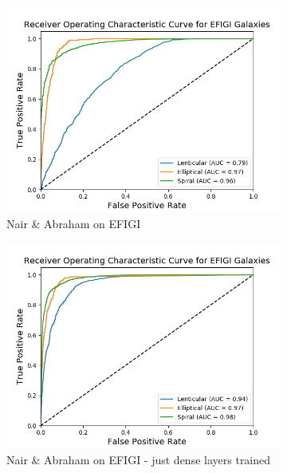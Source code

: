 \documentclass[12pt, onecolumn]{aa}
\begin{document}
\begin{figure}[t!]
  \begin{subfigure}[t]{0.5\linewidth}
    \includegraphics[width=\linewidth]{Figures/Results_ROC's/ROC_A_on_E.png} 
    \caption{ Nair \& Abraham on EFIGI} \label{fig:A_on_e}
  \end{subfigure} 
  \begin{subfigure}[t]{0.5\linewidth}
    \includegraphics[width=\linewidth]{Figures/Results_ROC's/A_on_E_JD.png} 
    \caption{ Nair \& Abraham on EFIGI - just dense layers trained} \label{fig:A_on_e_JD}
  \end{subfigure} 
  \begin{center}
  \begin{subfigure}[t]{0.5\linewidth}

\end{subfigure}
\end{center}
\end{figure}
\end{document}
